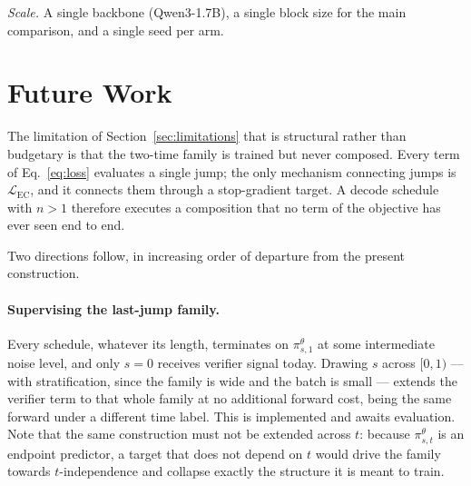 \documentclass{zapiski}
\newcommand{\pmap}[2]{\pi^{\theta}_{#1,#2}}
\begin{document}
\emph{Scale.} A single backbone (Qwen3-1.7B), a single block size for the main
comparison, and a single seed per arm.

\section{Future Work}
\label{sec:future}

The limitation of Section~\ref{sec:limitations} that is structural rather than
budgetary is that the two-time family is trained but never composed. Every term
of Eq.~\eqref{eq:loss} evaluates a single jump; the only mechanism connecting
jumps is $\mathcal{L}_{\mathrm{EC}}$, and it connects them through a
stop-gradient target. A decode schedule with $n>1$ therefore executes a
composition that no term of the objective has ever seen end to end.

Two directions follow, in increasing order of departure from the present
construction.

\paragraph{Supervising the last-jump family.} Every schedule, whatever its
length, terminates on $\pmap{s}{1}$ at some intermediate noise level, and only
$s=0$ receives verifier signal today. Drawing $s$ across $[0,1)$ --- with
stratification, since the family is wide and the batch is small --- extends the
verifier term to that whole family at no additional forward cost, being the
same forward under a different time label. This is implemented and awaits
evaluation. Note that the same construction must not be extended across $t$:
because $\pmap{s}{t}$ is an endpoint predictor, a target that does not depend
on $t$ would drive the family towards $t$-independence and collapse exactly the
structure it is meant to train.
\end{document}
